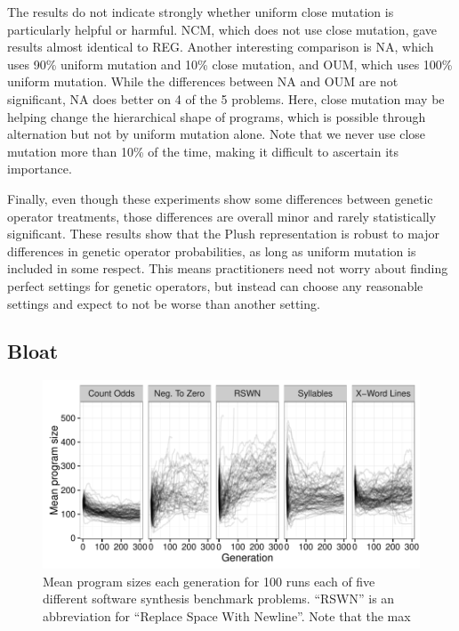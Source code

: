 \documentclass[graybox]{svmult}
\begin{document}
The results do not indicate strongly whether uniform close mutation is particularly helpful or harmful. NCM, which does not use close mutation, gave results almost identical to REG. Another interesting comparison is NA, which uses 90\% uniform mutation and 10\% close mutation, and OUM, which uses 100\% uniform mutation. While the differences between NA and OUM are not significant, NA does better on 4 of the 5 problems. Here, close mutation may be helping change the hierarchical shape of programs, which is possible through alternation but not by uniform mutation alone. Note that we never use close mutation more than 10\% of the time, making it difficult to ascertain its importance.

Finally, even though these experiments show some differences between genetic operator treatments, those differences are overall minor and rarely statistically significant. These results show that the Plush representation is robust to major differences in genetic operator probabilities, as long as uniform mutation is included in some respect. This means practitioners need not worry about finding perfect settings for genetic operators, but instead can choose any reasonable settings and expect to not be worse than another setting.

\subsection{Bloat}

\begin{figure}[tb]
\includegraphics[width=\textwidth]{program_sizes_3x6_relabelled}
\caption{Mean program sizes each generation for 100 runs each of five different software synthesis benchmark problems. ``RSWN'' is an abbreviation for ``Replace Space With Newline''. Note that the max}
\label{fig:programSizes}
\end{figure}
\end{document}
